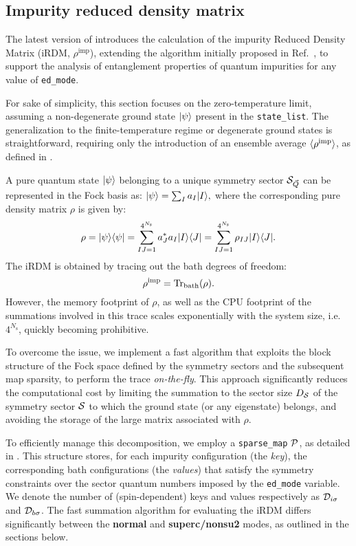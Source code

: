 \documentclass[edipack_sp.tex]{subfiles}
\begin{document}
\subsection{Impurity reduced density matrix}\label{sSecRDM}
The latest version of \NAME introduces the calculation of the 
impurity Reduced Density Matrix (iRDM, $\rho^\mathrm{imp}$), 
extending the algorithm initially proposed in 
Ref.~, to support the analysis of entanglement 
properties of quantum impurities for any value of {\tt ed\_mode}.

For sake of simplicity, this section focuses on the zero-temperature limit, 
assuming a non-degenerate ground state $|\psi\rangle$ present in the 
{\tt state\_list}. The generalization to the finite-temperature regime 
or degenerate ground states is straightforward, requiring only the  introduction of an
ensemble average $\langle \rho^\mathrm{imp} \rangle$, as defined in 
.


A pure quantum state $|\psi\rangle$ belonging to a unique symmetry 
sector ${\cal S}_{\vec{Q}}$ can be represented in the Fock basis as:
$
|\psi\rangle = \sum_I a_I |I\rangle,
$
where the corresponding pure density matrix $\rho$ is given by:
\begin{equation}
\rho = |\psi\rangle\langle \psi| = \sum_{IJ=1}^{4^{N_\mathrm{s}}} 
a^*_J a_I |I\rangle\langle J| = \sum_{IJ=1}^{4^{N_\mathrm{s}}} 
\rho_{IJ} |I\rangle\langle J|.
\end{equation}
The iRDM is obtained by tracing out the bath degrees of freedom:
\begin{equation}
\rho^\mathrm{imp} = {\rm Tr}_\mathrm{bath}(\rho).
\end{equation}
However, the memory footprint of $\rho$, as well as the CPU footprint 
of the summations involved in this trace scales exponentially 
with the system size, i.e.~$4^{N_\mathrm{s}}$, quickly becoming prohibitive.

To overcome the issue, we implement a fast algorithm that exploits the 
block structure of the Fock space defined by the symmetry sectors and
the subsequent map sparsity, to perform the trace \emph{on-the-fly}. 
This approach significantly reduces the computational cost by limiting 
the summation to the sector size $D_{\cal S}$ of the symmetry sector 
${\cal S}$ to which the ground state (or any eigenstate) belongs, and avoiding
the storage of the large matrix associated with $\rho$.

To efficiently manage this decomposition, we employ a 
{\tt sparse\_map} ${\cal P}$, as detailed in . 
This structure stores, for each impurity configuration 
(the \emph{key}), the 
corresponding bath configurations 
(the \emph{values}) that 
satisfy the symmetry constraints over the sector quantum numbers
imposed by the {\tt ed\_mode} variable.
We denote the number of (spin-dependent) keys and values respectively
as ${\cal D}_{i\sigma}$ and ${\cal D}_{b\sigma}$.
The fast summation algorithm for evaluating the iRDM differs 
significantly between the {\bf normal} and {\bf superc/nonsu2} modes, 
as outlined in the sections below.
\end{document}

